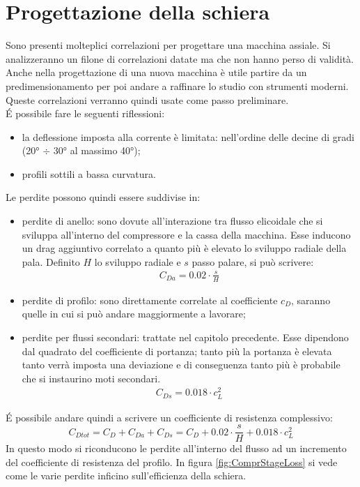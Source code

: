 \section{Progettazione della schiera}
Sono presenti molteplici correlazioni per progettare una macchina assiale. Si analizzeranno un filone di correlazioni datate ma che non hanno perso di validità. Anche nella progettazione di una nuova macchina è utile partire da un predimensionamento per poi andare a raffinare lo studio con strumenti moderni. Queste correlazioni verranno quindi usate come passo preliminare.\\
\'E possibile fare le seguenti riflessioni:
\begin{itemize}
\item la deflessione imposta alla corrente è limitata: nell'ordine delle decine di gradi (\ang{20} $\div$ \ang{30} al massimo \ang{40});
\item profili sottili a bassa curvatura.
\end{itemize}
Le perdite possono quindi essere suddivise in:
\begin{itemize}
\item perdite di anello: sono dovute all'interazione tra flusso elicoidale che si sviluppa all'interno del compressore e la cassa della macchina. Esse inducono un drag aggiuntivo correlato a quanto più è elevato lo sviluppo radiale della pala. Definito $H$ lo sviluppo radiale e $s$ passo palare, si può scrivere:
\begin{align*}
C_{Da} = 0.02 \cdot \frac{s}{H}
\end{align*}
\item perdite di profilo: sono direttamente correlate al coefficiente $c_D$, saranno quelle in cui si può andare maggiormente a lavorare;
\item perdite per flussi secondari: trattate nel capitolo precedente. Esse dipendono dal quadrato del coefficiente di portanza; tanto più la portanza è elevata tanto verrà imposta una deviazione e di conseguenza tanto più è probabile che si instaurino moti secondari.
\begin{align*}
C_{Ds} = 0.018 \cdot c_L^2
\end{align*}
\end{itemize}
\'E possibile andare quindi a scrivere un coefficiente di resistenza complessivo:
\begin{equation}
C_{Dtot} = C_D + C_{Da} + C_{Ds} = C_D + 0.02 \cdot \frac{s}{H} + 0.018 \cdot c_L^2
\label{eq:Cdtot}
\end{equation}
In questo modo si riconducono le perdite all'interno del flusso ad un incremento del coefficiente di resistenza del profilo. In figura \ref{fig:ComprStageLoss} si vede come le varie perdite inficino sull'efficienza della schiera.
